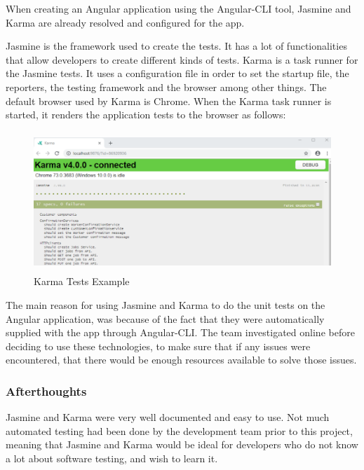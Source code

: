 \bigskip

When creating an Angular application using the Angular-CLI tool, Jasmine and Karma are already resolved and configured for the app.

Jasmine is the framework used to create the tests. It has a lot of functionalities that allow developers to create different kinds of tests.
Karma is a task runner for the Jasmine tests. It uses a configuration file in order to set the startup file, the reporters, the testing framework and the browser among other things.
The default browser used by Karma is Chrome. When the Karma task runner is started, it renders the application tests to the browser as follows:

\begin{figure}[H]
    \centering
    \includegraphics[width=\textwidth, height=150pt]{img/Karma2.PNG}
    \caption{Karma Tests Example}
    \label{fig:my_label}
\end{figure}


\bigskip

The main reason for using Jasmine and Karma to do the unit tests on the Angular application, was because of the fact that they were automatically supplied with the app through Angular-CLI. The team investigated online before deciding to use these technologies, to make sure that if any issues were encountered, that there would be enough resources available to solve those issues. 

\bigskip

\subsubsection{Afterthoughts}

Jasmine and Karma were very well documented and easy to use. Not much automated testing had been done by the development team prior to this project, meaning that Jasmine and Karma would be ideal for developers who do not know a lot about software testing, and wish to learn it.
